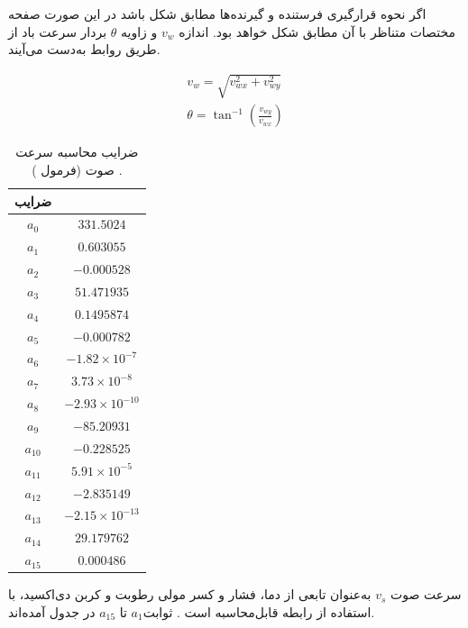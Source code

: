 اگر نحوه قرارگیری فرستنده و گیرنده‌ها مطابق شکل  باشد در این صورت صفحه مختصات متناظر با آن مطابق شکل  خواهد بود. اندازه $v_w$ و زاویه $\theta$ بردار سرعت باد از طریق روابط  به‌دست می‌آیند.

\begin{equation}\label{eq:windSpeed}
	\begin{split}
		v_w = \sqrt{v_{wx}^2 + v_{wy}^2}\\
		\theta = \tan^{-1}{\left( \frac{v_{wy}}{v_{wx}}\right)}
	\end{split}	
\end{equation}

\begin{table}[!t]
	\centering
	\caption{ضرایب  محاسبه سرعت صوت (فرمول ) .}
	\label{tb:speedOfSoundcoefficients}
	\begin{tabular}{cc}
		\hline \hline
		ضرایب & \\
		\hline
		$a_{0}$ & $331.5024$ \\
		$a_{1}$ & $0.603055$ \\
		$a_{2}$ & $-0.000528$ \\
		$a_{3}$ & $51.471935$ \\
		$a_{4}$ & $0.1495874$ \\
		$a_{5}$ & $-0.000782$ \\
		$a_{6}$ & $-1.82 \times 10^{-7}$ \\
		$a_{7}$ & $3.73 \times 10^{-8}$ \\
		$a_{8}$ & $-2.93 \times 10^{-10}$ \\
		$a_{9}$ & $-85.20931$ \\
		$a_{10}$ & $-0.228525$ \\
		$a_{11}$ & $5.91 \times 10^{-5}$ \\
		$a_{12}$ & $-2.835149$ \\
		$a_{13}$ & $-2.15 \times 10^{-13}$ \\
		$a_{14}$ & $29.179762$ \\
		$a_{15}$ & $0.000486$ \\
		\hline
	\end{tabular}
\end{table}

سرعت صوت $v_s$ به‌عنوان تابعی از دما، فشار و کسر مولی رطوبت و کربن دی‌اکسید، با استفاده از رابطه  قابل‌محاسبه است . ثوابت$a_1$ تا $a_{15}$ در جدول  آمده‌اند.


